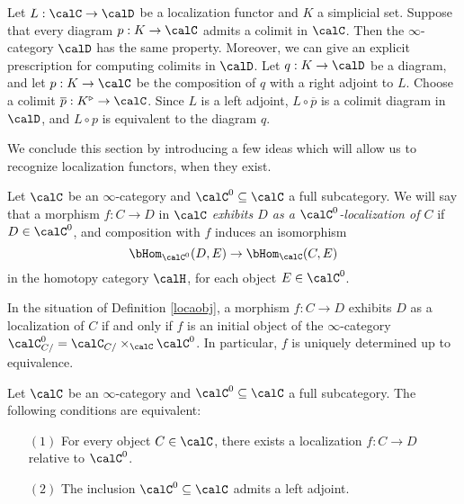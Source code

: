 \begin{remark}\label{localcolim}
Let $L: \calC \rightarrow \calD$ be a localization functor and $K$ a simplicial set. Suppose
that every diagram $p: K \rightarrow \calC$ admits a colimit in $\calC$. Then the $\infty$-category $\calD$ has the same property. Moreover, we can give an explicit prescription for computing colimits in $\calD$. Let $q: K \rightarrow \calD$ be a diagram, and let
$p: K \rightarrow \calC$ be the composition of $q$ with a right adjoint to $L$. 
Choose a colimit $\overline{p}: K^{\triangleright} \rightarrow \calC$. Since $L$ is a left
adjoint, $L \circ \overline{p}$ is a colimit diagram in $\calD$, and $L \circ p$ is equivalent
to the diagram $q$.
\end{remark}

We conclude this section by introducing a few ideas which will allow us to recognize localization functors, when they exist.

\begin{definition}\label{locaobj}
Let $\calC$ be an $\infty$-category and $\calC^{0} \subseteq \calC$ a full subcategory. We will say that a morphism $f: C \rightarrow D$ in $\calC$ {\it exhibits $D$ as a $\calC^0$-localization of $C$} if $D \in \calC^{0}$, and composition with $f$ induces an isomorphism
$$ \bHom_{\calC^{0}}(D,E) \rightarrow \bHom_{\calC}(C,E)$$ in the homotopy category $\calH$, for each object $E \in \calC^{0}$.
\end{definition}

\begin{remark}\label{initrem}
In the situation of Definition \ref{locaobj}, a morphism $f: C \rightarrow D$ exhibits
$D$ as a localization of $C$ if and only if $f$ is an initial object of the $\infty$-category
$\calC^{0}_{C/} = \calC_{C/} \times_{\calC} \calC^{0}$. In particular, $f$ is uniquely determined up to equivalence.
\end{remark}

\begin{proposition}\label{testreflect}
Let $\calC$ be an $\infty$-category and $\calC^0 \subseteq \calC$ a full subcategory.
The following conditions are equivalent:
\begin{itemize}
\item[$(1)$] For every object $C \in \calC$, there exists a localization
$f: C \rightarrow D$ relative to $\calC^{0}$.
\item[$(2)$] The inclusion $\calC^{0} \subseteq \calC$ admits a left adjoint.
\end{itemize}
\end{proposition}

